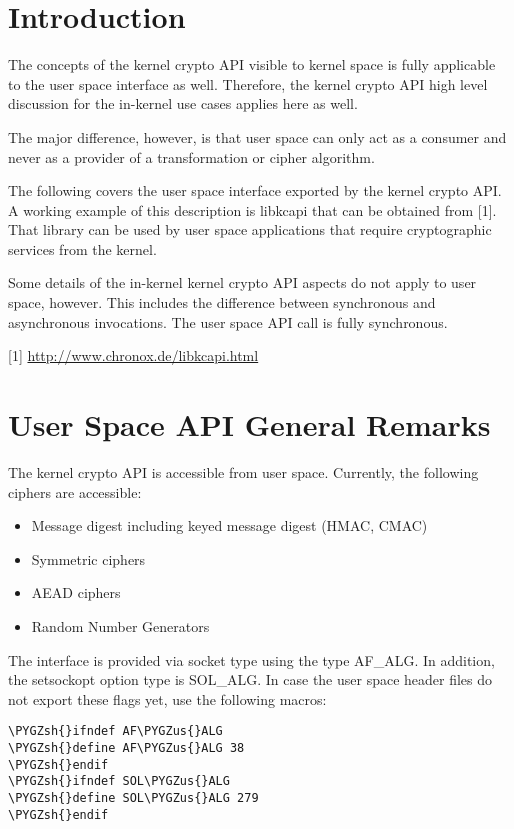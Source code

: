 \documentclass[a4paper,8pt,english]{sphinxmanual}
\def\PYGZus{\char`\_}
\def\PYGZsh{\char`\#}
\begin{document}
\section{Introduction}
\label{crypto/userspace-if:introduction}
The concepts of the kernel crypto API visible to kernel space is fully
applicable to the user space interface as well. Therefore, the kernel
crypto API high level discussion for the in-kernel use cases applies
here as well.

The major difference, however, is that user space can only act as a
consumer and never as a provider of a transformation or cipher
algorithm.

The following covers the user space interface exported by the kernel
crypto API. A working example of this description is libkcapi that can
be obtained from {[}1{]}. That library can be used by user space
applications that require cryptographic services from the kernel.

Some details of the in-kernel kernel crypto API aspects do not apply to
user space, however. This includes the difference between synchronous
and asynchronous invocations. The user space API call is fully
synchronous.

{[}1{]} \url{http://www.chronox.de/libkcapi.html}


\section{User Space API General Remarks}
\label{crypto/userspace-if:user-space-api-general-remarks}
The kernel crypto API is accessible from user space. Currently, the
following ciphers are accessible:
\begin{itemize}
\item {} 
Message digest including keyed message digest (HMAC, CMAC)

\item {} 
Symmetric ciphers

\item {} 
AEAD ciphers

\item {} 
Random Number Generators

\end{itemize}

The interface is provided via socket type using the type AF\_ALG. In
addition, the setsockopt option type is SOL\_ALG. In case the user space
header files do not export these flags yet, use the following macros:

\begin{Verbatim}[commandchars=\\\{\}]
\PYGZsh{}ifndef AF\PYGZus{}ALG
\PYGZsh{}define AF\PYGZus{}ALG 38
\PYGZsh{}endif
\PYGZsh{}ifndef SOL\PYGZus{}ALG
\PYGZsh{}define SOL\PYGZus{}ALG 279
\PYGZsh{}endif
\end{Verbatim}
\end{document}
